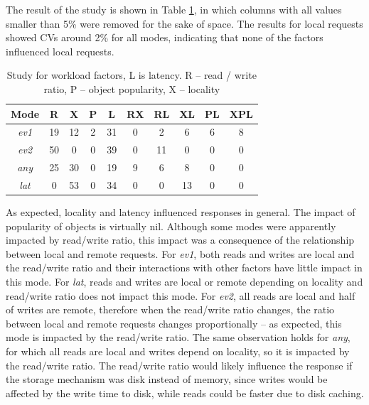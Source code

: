 \documentclass[doublespacing]{bmcart}
\begin{document}
The result of the study is shown in Table
\ref{tab:estudo_para_fatores_de_carga_de_trabalho}, in which columns with all
values smaller than 5\% were removed for the sake of space. The results for
local requests showed CVs around 2\% for all modes, indicating that none of the
factors influenced local requests.

\begin{table}[h!]
\caption{Study for workload factors, L is latency. R -- read / write ratio, P
-- object popularity, X -- locality}
\begin{tabular}{cccccccccc} \hline

Mode & R & X & P & L & RX & RL & XL & PL & XPL\\\hline

\textit{ev1} & 19 & 12 & 2 & 31 & 0 & 2 & 6 & 6 & 8\\

\textit{ev2} & 50 & 0 & 0 & 39 & 0 & 11 & 0 & 0 & 0\\

\textit{any} & 25 & 30 & 0 & 19 & 9 & 6 & 8 & 0 & 0\\

\textit{lat} & 0 & 53 & 0 & 34 & 0 & 0 & 13 & 0 & 0\\\hline

\end{tabular} 
\label{tab:estudo_para_fatores_de_carga_de_trabalho}
\end{table}

As expected, locality and latency influenced responses in general. The impact
of popularity of objects is virtually nil. Although some modes were apparently
impacted by read/write ratio, this impact was a consequence of the relationship
between local and remote requests. For \textit{ev1}, both reads and writes are
local and the read/write ratio and their interactions with other factors have
little impact in this mode. For \textit{lat}, reads and writes are local or
remote depending on locality and read/write ratio does not impact this mode.
For \textit{ev2}, all reads are local and half of writes are remote, therefore
when the read/write ratio changes, the ratio between local and remote requests
changes proportionally -- as expected, this mode is impacted by the read/write
ratio. The same observation holds for \textit{any}, for which all reads are
local and writes depend on locality, so it is impacted by the read/write ratio.
The read/write ratio would likely influence the response if the storage
mechanism was disk instead of memory, since writes would be affected by the
write time to disk, while reads could be faster due to disk caching.
\end{document}
